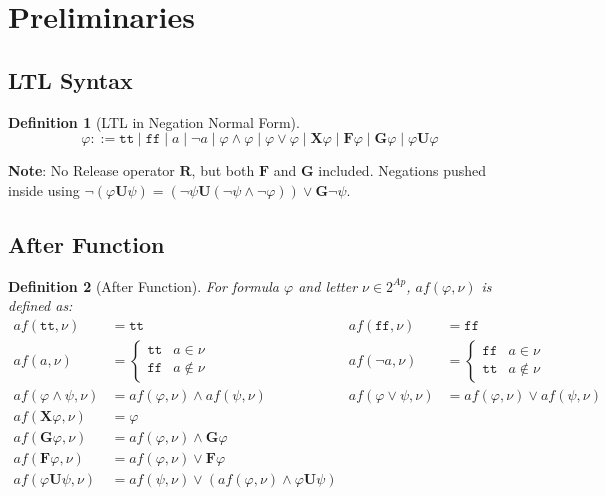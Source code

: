 \documentclass{article}
\newtheorem{definition}{Definition}
\begin{document}
\section{Preliminaries}

\subsection{LTL Syntax}

\begin{definition}[LTL in Negation Normal Form]
\begin{equation}
\varphi ::= \mathtt{tt} \mid \mathtt{ff} \mid a \mid \neg a \mid \varphi \land \varphi \mid \varphi \lor \varphi \mid \mathbf{X}\varphi \mid \mathbf{F}\varphi \mid \mathbf{G}\varphi \mid \varphi \mathbf{U}\varphi
\end{equation}
\end{definition}

\textbf{Note}: No Release operator $\mathbf{R}$, but both $\mathbf{F}$ and $\mathbf{G}$ included. Negations pushed inside using $\neg(\varphi \mathbf{U}\psi) = (\neg\psi \mathbf{U}(\neg\psi \land \neg\varphi)) \lor \mathbf{G}\neg\psi$.

\subsection{After Function}

\begin{definition}[After Function]
For formula $\varphi$ and letter $\nu \in 2^{Ap}$, $af(\varphi, \nu)$ is defined as:
\begin{align}
af(\mathtt{tt}, \nu) &= \mathtt{tt} & af(\mathtt{ff}, \nu) &= \mathtt{ff}\\
af(a, \nu) &= \begin{cases}\mathtt{tt} & a \in \nu\\ \mathtt{ff} & a \notin \nu\end{cases} & af(\neg a, \nu) &= \begin{cases}\mathtt{ff} & a \in \nu\\ \mathtt{tt} & a \notin \nu\end{cases}\\
af(\varphi \land \psi, \nu) &= af(\varphi, \nu) \land af(\psi, \nu) & af(\varphi \lor \psi, \nu) &= af(\varphi, \nu) \lor af(\psi, \nu)\\
af(\mathbf{X}\varphi, \nu) &= \varphi\\
af(\mathbf{G}\varphi, \nu) &= af(\varphi, \nu) \land \mathbf{G}\varphi\\
af(\mathbf{F}\varphi, \nu) &= af(\varphi, \nu) \lor \mathbf{F}\varphi\\
af(\varphi \mathbf{U}\psi, \nu) &= af(\psi, \nu) \lor (af(\varphi, \nu) \land \varphi \mathbf{U}\psi)
\end{align}
\end{definition}
\end{document}

